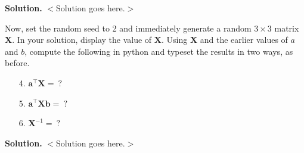 \documentclass[10pt]{article}
\begin{document}
\begin{enumerate}
\begin{itemize}
{\bf Solution.} $<$Solution goes here.$>$

Now, set the random seed to 2 and immediately generate a random $3 \times 3$ matrix $\mathbf{X}$.  In your solution, display the value of $\mathbf{X}$.  Using $\mathbf{X}$ and the earlier values of $a$ and $b$, compute the following in python and typeset the results in two ways, as before.
\begin{enumerate}
\item[4.] $\mathbf{a}^\top\mathbf{X} = ~?$
\item[5.] $\mathbf{a}^\top\mathbf{X}\mathbf{b} = ~?$
\item[6.] $\mathbf{X}^{-1} = ~?$
\end{enumerate}

{\bf Solution.} $<$Solution goes here.$>$


\end{itemize}

\end{enumerate}
\end{document}
